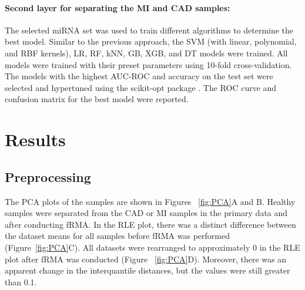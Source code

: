 \documentclass[sn-mathphys,Numbered]{sn-jnl}%
\theoremstyle{thmstyleone}%
\theoremstyle{thmstyletwo}%
\theoremstyle{thmstylethree}%
\begin{document}
\paragraph{Second layer for separating the MI and CAD
samples:}\label{second-layer-for-separating-the-mi-and-cad-samples-1}

The selected miRNA set was used to train different algorithms to
determine the best model. Similar to the previous approach, the SVM
(with linear, polynomial, and RBF kernels), LR, RF, kNN, GB, XGB, and DT
models were trained. All models were trained with their preset
parameters using 10-fold cross-validation. The models with the highest
AUC-ROC and accuracy on the test set were selected and hypertuned using
the scikit-opt package \cite{scikitopt}. The ROC curve and confusion
matrix for the best model were reported.




\section{Results}\label{results}

\subsection{Preprocessing}\label{preprocessing-1}

The PCA plots of the samples are shown in Figures ~\ref{fig:PCA}A and B.
Healthy samples were separated from the CAD or MI samples in the primary
data and after conducting fRMA. In the RLE plot, there was a distinct
difference between the dataset means for all samples before fRMA was
performed (Figure~\ref{fig:PCA}C). All datasets were rearranged to
approximately 0 in the RLE plot after fRMA was conducted (Figure
~\ref{fig:PCA}D). Moreover, there was an apparent change in the
interquantile distances, but the values were still greater than 0.1.
\end{document}
